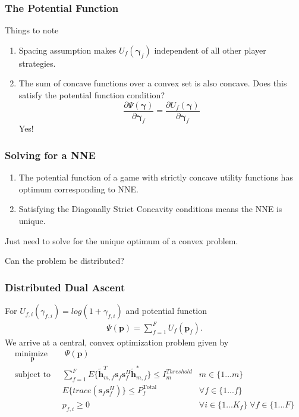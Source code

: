 \documentclass[10pt,tgadventor, onlymath]{beamer}
\begin{document}
\begin{frame}
\frametitle{The Potential Function}
Things to note
\begin{enumerate}
\item
	Spacing assumption makes $U_{f}(\boldsymbol{\gamma}_{f})$ independent of all other player strategies. 

\item
	The sum of concave functions over a convex set is also concave. Does this satisfy the potential function condition?
	\begin{equation*}\label{potential_game_condition}
\frac{\partial \Psi(\boldsymbol{\gamma})}{\partial \boldsymbol{\gamma}_{f}}
 =
 \frac{\partial U_f(\boldsymbol{\gamma})}{\partial \boldsymbol{\gamma}_{f}}
\end{equation*} 
Yes!
\end{enumerate}

\end{frame}

\begin{frame}
\frametitle{Solving for a NNE}
\begin{enumerate}
\setlength\itemsep{2em}

\item
	The potential function of a game with strictly concave utility functions has optimum corresponding to NNE.
\item
	Satisfying the Diagonally Strict Concavity conditions means the NNE is unique.
\end{enumerate}
\bigskip
Just need to solve for the unique optimum of a convex problem.
\pause
\par
 Can the problem be distributed?
\end{frame}

\begin{frame}
\frametitle{Distributed Dual Ascent}
For $U_{f,i}(\gamma_{f,i}) = log(1+\gamma_{f,i})$ and potential function
\begin{gather*} \label{Potential_Function}
\Psi(\mathbf{p}) = \sum_{f = 1}^{F} U_{f}(\mathbf{p}_{f}).
\end{gather*}
We arrive at a central, convex optimization problem given by
		\begin{subequations}
	\label{optim}
	\begin{align}
	    \underset{\mathbf{p}}{\text{minimize  }}
	    & \; \Psi(\mathbf{p}) \label{potential_game} \\
	    \text{subject to  } \; &
	  \sum^F_{f=1} E\{\tilde{\mathbf{h}}_{m,f}^T  \mathbf{s}_{f} 						
	\mathbf{s}_{f}^{H} \tilde{\mathbf{h}}_{m,f}^* \}\leq I^{Threshold}		
	_{m} & m \in \{1 ...m\} 
		\label{interference_const}\\
        & E\{trace(\mathbf{s}_f\mathbf{s}_f^H)\}  \leq P_{f}^{\text{Total}}  \label{power_const}
        & \forall f \in \{1 ... f\}\\
        & p_{f,i} \geq 0 &  \forall i \in \{1 ...K_{f}\} \; \forall f \in \{1 ... F\}\label{pos_power_const}
	\end{align}
	\end{subequations}
\end{frame}
\end{document}

